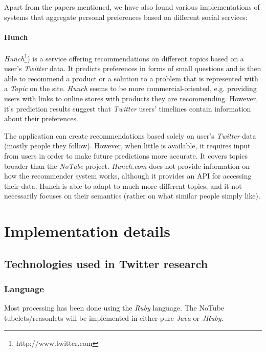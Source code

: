 \documentclass{article}
\begin{document}
Apart from the papers mentioned, we have also found various implementations of systems that aggregate personal preferences based on different
social services:

\paragraph{Hunch}
\textit{Hunch}\footnote[2]{http://www.twitter.com}) is a service offering recommendations on different topics based on a user's \textit{Twitter} data. It predicts preferences in forms of small questions and is then able to recommend a product or a solution to a problem that is represented with a \textit{Topic} on the site. \textit{Hunch} seems to be more commercial-oriented, e.g. providing users with links to online stores with products they are recommending. However,
it's prediction results suggest that \textit{Twitter} users' timelines contain information about their preferences.

The application can create recommendations based solely on user's \textit{Twitter} data (mostly people they follow). However, when little is available, it requires input from users in order to make future predictions more accurate. It covers topics broader than the \textit{NoTube} project.
\textit{Hunch.com} does not provide information on how the recommender system works, although it provides an API for accessing their data.
Hunch is able to adapt to much more different topics, and it not necessarily focuses on their semantics (rather on what similar people simply like).















\section{Implementation details}

\subsection{Technologies used in Twitter research}
\subsubsection{Language}
Most processing has been done using the \textit{Ruby} language. The NoTube tubelets/reasonlets will be implemented in either pure \textit{Java} or \textit{JRuby}.
\end{document}
